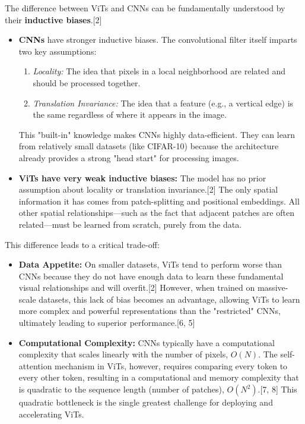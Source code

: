 The difference between ViTs and CNNs can be fundamentally understood by their \textbf{inductive biases}.[2]
\begin{itemize}
    \item \textbf{CNNs} have stronger inductive biases. The convolutional filter itself imparts two key assumptions:
        \begin{enumerate}
            \item \textit{Locality:} The idea that pixels in a local neighborhood are related and should be processed together.
            \item \textit{Translation Invariance:} The idea that a feature (e.g., a vertical edge) is the same regardless of where it appears in the image.
        \end{enumerate}
    This "built-in" knowledge makes CNNs highly data-efficient. They can learn from relatively small datasets (like CIFAR-10) because the architecture already provides a strong "head start" for processing images.

    \item \textbf{ViTs have very weak inductive biases:} The model has no prior assumption about locality or translation invariance.[2] The only spatial information it has comes from patch-splitting and positional embeddings. All other spatial relationships—such as the fact that adjacent patches are often related—must be learned from scratch, purely from the data.
\end{itemize}

This difference leads to a critical trade-off:
\begin{itemize}
    \item \textbf{Data Appetite:} On smaller datasets, ViTs tend to perform worse than CNNs because they do not have enough data to learn these fundamental visual relationships and will overfit.[2] However, when trained on massive-scale datasets, this lack of bias becomes an advantage, allowing ViTs to learn more complex and powerful representations than the "restricted" CNNs, ultimately leading to superior performance.[6, 5]
    \item \textbf{Computational Complexity:} CNNs typically have a computational complexity that scales linearly with the number of pixels, \textbf{$O(N)$}. The self-attention mechanism in ViTs, however, requires comparing every token to every other token, resulting in a computational and memory complexity that is quadratic to the sequence length (number of patches), \textbf{$O(N^2)$}.[7, 8] This quadratic bottleneck is the single greatest challenge for deploying and accelerating ViTs.
\end{itemize}

